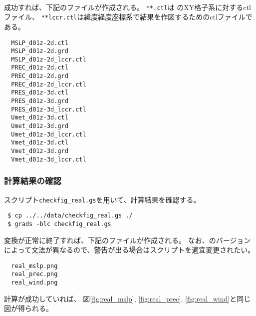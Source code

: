 \\

成功すれば、下記のファイルが作成される。
\verb|**.ctl|は {\scalerm} のXY格子系に対するctlファイル、
\verb|**lccr.ctl|は緯度経度座標系で結果を作図するためのctlファイルである。

\begin{verbatim}
  MSLP_d01z-2d.ctl
  MSLP_d01z-2d.grd
  MSLP_d01z-2d_lccr.ctl
  PREC_d01z-2d.ctl
  PREC_d01z-2d.grd
  PREC_d01z-2d_lccr.ctl
  PRES_d01z-3d.ctl
  PRES_d01z-3d.grd
  PRES_d01z-3d_lccr.ctl
  Umet_d01z-3d.ctl
  Umet_d01z-3d.grd
  Umet_d01z-3d_lccr.ctl
  Vmet_d01z-3d.ctl
  Vmet_d01z-3d.grd
  Vmet_d01z-3d_lccr.ctl
\end{verbatim}




\subsubsection{計算結果の確認}


\grads スクリプト\verb|checkfig_real.gs|を用いて、計算結果を確認する。
\begin{verbatim}
 $ cp ../../data/checkfig_real.gs ./
 $ grads -blc checkfig_real.gs
\end{verbatim}
変換が正常に終了すれば、下記のファイルが作成される。
なお、\grads のバージョンによって文法が異なるので、警告が出る場合はスクリプトを適宜変更されたい。
\begin{verbatim}
  real_mslp.png
  real_prec.png
  real_wind.png
\end{verbatim}
計算が成功していれば、
図\ref{fig:real_mslp}, \ref{fig:real_prec}, \ref{fig:real_wind}と同じ図が得られる。


